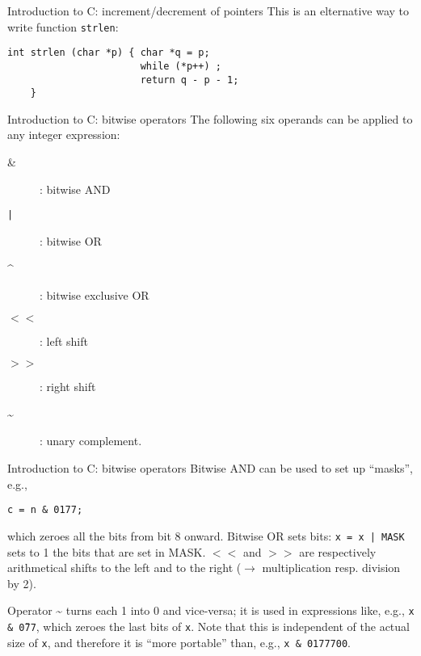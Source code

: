 \begin{frame}[fragile]{Introduction to C: increment/decrement of pointers}
This is an elternative way to write function \verb"strlen":
\begin{verbatim}
int strlen (char *p) { char *q = p;
                       while (*p++) ;
                       return q - p - 1;
    }
\end{verbatim}

\end{frame}
\begin{frame}[fragile]{Introduction to C: bitwise operators}
The following six operands can be applied to any integer expression:


\vspace{20pt}

\begin{description}
\item[\&] : bitwise AND
\item[{\tt |}] : bitwise OR
\item[\^{}] : bitwise exclusive OR
\item[$<<$] : left shift
\item[$>>$] : right shift
\item[\~{}] : unary complement.
\end{description}


\end{frame}
\begin{frame}[fragile]{Introduction to C: bitwise operators}
Bitwise AND can be used to set up ``masks'', e.g.,
\begin{center}\tt c = n \& 0177;
\end{center}
which zeroes all the bits from bit 8 onward. Bitwise OR
sets bits: 
{\tt x = x | MASK} sets to 1 the bits that are set in MASK.
$<<$ and $>>$ are respectively arithmetical shifts to the left and to the right
($\rightarrow$
multiplication resp. division by 2).


\vspace{20pt}

Operator \~{} turns each 1 into 0 and vice-versa; it is used in expressions
like, e.g.,
{\tt x \& \~ 077}, which zeroes the last bits of \verb"x".
Note that this is independent of the actual size of \verb"x", and
therefore it is ``more portable'' than, e.g.,
{\tt x \& 0177700}.



\end{frame}
